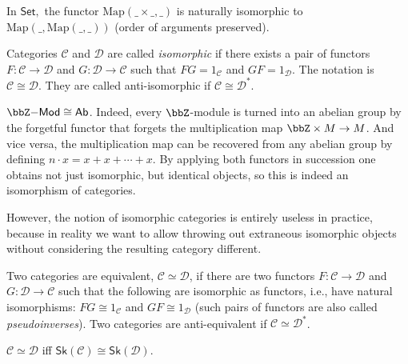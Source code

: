 %
\begin{example}
In $\mathsf{Set},$ the functor $\mathrm{Map}\left(\_\times\_,\_\right)$
is naturally isomorphic to $\mathrm{Map}\left(\_,\mathrm{Map}\left(\_,\_\right)\right)$
(order of arguments preserved).
\end{example}
\begin{defn}
Categories $\mathcal{C}$ and $\mathcal{D}$ are called \emph{isomorphic}
if there exists a pair of functors $F:\mathcal{C}\to\mathcal{D}$
and $G:\mathcal{D}\to\mathcal{C}$ such that $FG=1_{\mathcal{C}}$
and $GF=1_{\mathcal{D}}$. The notation is $\mathcal{C}\cong\mathcal{D}$.
They are called anti-isomorphic if $\mathcal{C}\cong\mathcal{D}^{\ast}$.
\end{defn}

\begin{example}
    $\bbZ\mathsf{-Mod}\cong \mathsf{Ab}$. Indeed, every $\bbZ$-module is turned into an abelian group by the forgetful functor that forgets the multiplication map $\bbZ\times M\to M$. And vice versa, the multiplication map can be recovered from any abelian group by defining $n\cdot x=x+x+\cdots +x$. By applying both functors in succession one obtains not just isomorphic, but identical objects, so this is indeed an isomorphism of categories.
\end{example}

However, the notion of isomorphic categories is entirely useless in
practice, because in reality we want to allow throwing out extraneous
isomorphic objects without considering the resulting category different.
\begin{defn}
 Two categories are equivalent, $\mathcal{C}\simeq\mathcal{D}$,
if there are two functors $F:\mathcal{C}\to\mathcal{D}$ and $G:\mathcal{D}\to\mathcal{C}$
such that the following are isomorphic as functors, i.e., have natural
isomorphisms: $FG\cong1_{\mathcal{C}}$ and $GF\cong1_{\mathcal{D}}$ (such pairs of functors are also called \emph{pseudoinverses}). 
Two categories are anti-equivalent if $\mathcal{C}\simeq\mathcal{D}^{\ast}$.
\end{defn}
%
\begin{prop}
$\mathcal{C}\simeq\mathcal{D}$ iff $\mathsf{Sk}\left(\mathcal{C}\right)\cong\mathsf{Sk}\left(\mathcal{D}\right)$.
\end{prop}

